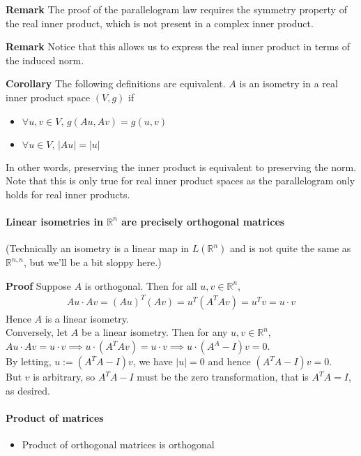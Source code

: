 \documentclass{article}
\begin{document}
\textbf{Remark} The proof of the parallelogram law requires the symmetry property of the real inner product, which is not present in a complex inner product.

\textbf{Remark} Notice that this allows us to express the real inner product in terms of the induced norm.

\textbf{Corollary} The following definitions are equivalent. $A$ is an isometry in a real inner product space $(V,g)$ if
\begin{itemize}
	\item $\forall u,v \in V,\, g(Au,Av)=g(u,v)$
	\item $\forall u\in V,\, |Au|=|u|$
\end{itemize} 
In other words, preserving the inner product is equivalent to preserving the norm. Note that this is only true for real inner product spaces as the parallelogram only holds for real inner products.

\paragraph{Linear isometries in $\mathbb{R}^n$ are precisely orthogonal matrices}
(Technically an isometry is a linear map in $L(\mathbb{R}^n)$ and is not quite the same as $\mathbb{R}^{n,n}$, but we'll be a bit sloppy here.)

\textbf{Proof} Suppose $A$ is orthogonal. Then for all $u,v\in \mathbb{R}^n$,
\begin{align*}
	Au\cdot Av = (Au)^T(Av)=u^T(A^TAv)=u^Tv=u\cdot v
\end{align*}
Hence $A$ is a linear isometry.\\
Conversely, let $A$ be a linear isometry. Then for any $u,v\in \mathbb{R}^n$, $Au\cdot Av = u\cdot v\implies u\cdot (A^TAv) = u\cdot v \implies u\cdot (A^A-I)v=0$.\\
By letting, $u:=(A^TA-I)v$, we have $|u|=0$ and hence $(A^TA-I)v=0$.\\
But $v$ is arbitrary, so $A^TA-I$ must be the zero transformation, that is $A^TA=I$, as desired.

\paragraph{Product of matrices}
\begin{itemize}
	\item Product of orthogonal matrices is orthogonal
\end{itemize}
\end{document}
